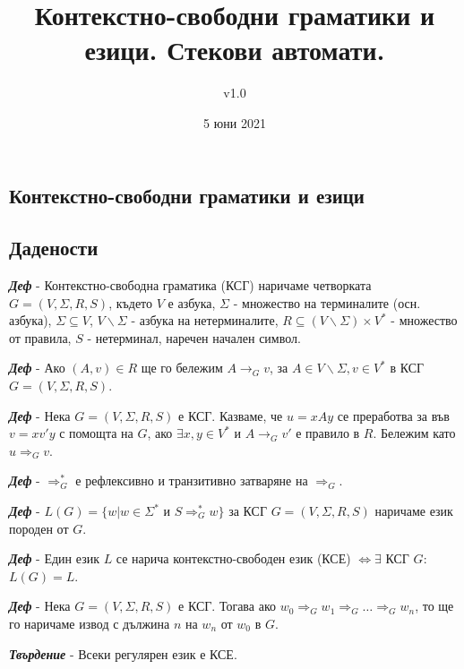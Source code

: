 \documentclass[fleqn,12pt]{article}
\title{Контекстно-свободни граматики и езици. Стекови автомати.}
\author{v1.0}
\date{5 юни 2021}
\begin{document}
\maketitle

\tableofcontents
\pagebreak
\begin{flushleft}

\section{Контекстно-свободни граматики и езици}
\subsection{Дадености}

\textit{\textbf{Деф}} - Контекстно-свободна граматика (КСГ) наричаме четворката $G = (V, \Sigma, R, S)$, където $V$ е азбука, $\Sigma$ - множество на терминалите (осн. азбука), $\Sigma \subseteq V$, $V \backslash \Sigma$ - азбука на нетерминалите, $R \subseteq (V \backslash \Sigma) \times V^*$ - множество от правила, $S$ - нетерминал, наречен начален символ.

\textit{\textbf{Деф}} - Ако $(A, v) \in R$ ще го бележим $A \to_G v$, за $A \in V \backslash \Sigma, v \in V^*$ в КСГ $G=(V, \Sigma, R, S)$.

\textit{\textbf{Деф}} - Нека $G = (V, \Sigma, R, S)$ е КСГ. Казваме, че $u = xAy$ се преработва за във $v = xv'y$ с помощта на $G$, ако $\exists x, y \in V^*$ и $A \to_G v'$ е правило в $R$. Бележим като $u \Rightarrow_G v$.

\textit{\textbf{Деф}} - $\Rightarrow_G^*$ е рефлексивно и транзитивно затваряне на $\Rightarrow_G$.

\textit{\textbf{Деф}} - $L(G) = \{w | w \in \Sigma^*$ и $ S \Rightarrow_G^* w\}$ за КСГ $G = (V, \Sigma, R, S)$ наричаме език породен от $G$.

\textit{\textbf{Деф}} - Един език $L$ се нарича контекстно-свободен език (КСЕ) $\iff \exists$ КСГ $G$: $L(G) = L$.

\textit{\textbf{Деф}} - Нека $G = (V, \Sigma, R, S)$ е КСГ. Тогава ако $w_0 \Rightarrow_G w_1 \Rightarrow_G \dots \Rightarrow_G w_n$, то ще го наричаме извод с дължина $n$ на $w_n$ от $w_0$ в $G$.

\textit{\textbf{Твърдение}} - Всеки регулярен език е КСЕ. 


\end{flushleft}
\end{document}
